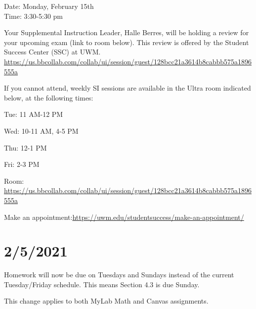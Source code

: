 \documentclass[]{article}
\begin{document}
Date: Monday, February 15th \\
Time: 3:30-5:30 pm

Your Supplemental Instruction Leader, Halle Berres, will be holding a review for your upcoming exam (link to room below). This review is offered by the Student Success Center (SSC) at UWM. \url{https://us.bbcollab.com/collab/ui/session/guest/128bcc21a3614b8cabbb575a1896555a}

If you cannot attend, weekly SI sessions are available in the Ultra room indicated below, at the following times: 

Tue: 11 AM-12 PM

Wed: 10-11 AM, 4-5 PM

Thu: 12-1 PM

Fri: 2-3 PM

Room: \url{https://us.bbcollab.com/collab/ui/session/guest/128bcc21a3614b8cabbb575a1896555a}

Make an appointment:\url{https://uwm.edu/studentsuccess/make-an-appointment/}



\section*{2/5/2021}
Homework will now be due on Tuesdays and Sundays instead of the current Tuesday/Friday schedule. This means Section 4.3 is due Sunday.

This change applies to both MyLab Math and Canvas assignments.
\end{document}
